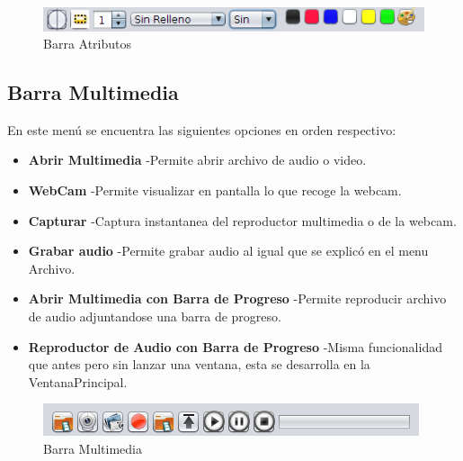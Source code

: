 \begin{figure}[H]
  \centering
    \includegraphics[scale=0.80]{images/barraatributos}
  \caption{Barra Atributos}
  \label{Barra Atributos}
\end{figure}

\subsection{Barra Multimedia}
En este menú se encuentra las siguientes opciones en orden respectivo:
\begin{itemize}
\item \textbf{Abrir Multimedia} -Permite abrir archivo de audio o video.
\item \textbf{WebCam} -Permite visualizar en pantalla lo que recoge la webcam.
\item \textbf{Capturar} -Captura instantanea del reproductor multimedia o de la webcam.
\item \textbf{Grabar audio} -Permite grabar audio al igual que se explicó en el menu Archivo.
\item \textbf{Abrir Multimedia con Barra de Progreso} -Permite reproducir archivo de audio adjuntandose una barra de progreso.
\item \textbf{Reproductor de Audio con Barra de Progreso} -Misma funcionalidad que antes pero sin lanzar una ventana, esta se desarrolla en la VentanaPrincipal.
\end{itemize}


\begin{figure}[H]
  \centering
    \includegraphics[scale=0.80]{images/barra_multimedia}
  \caption{Barra Multimedia}
  \label{Barra Multimedia}
\end{figure}



